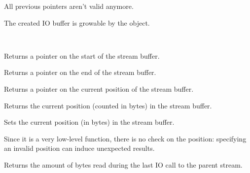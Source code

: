 
All previous pointers aren't valid anymore.


The created IO buffer is growable by the object.


\\

\label{wxstreambuffergetbufferstart}


Returns a pointer on the start of the stream buffer.

\label{wxstreambuffergetbufferend}


Returns a pointer on the end of the stream buffer.

\label{wxstreambuffergetbufferpos}


Returns a pointer on the current position of the stream buffer.

\label{wxstreambuffergetintposition}


Returns the current position (counted in bytes) in the stream buffer.

\label{wxstreambuffersetintposition}


Sets the current position (in bytes) in the stream buffer.


Since it is a very low-level function, there is no check on the position:
specifying an invalid position can induce unexpected results.

\label{wxstreambuffergetlastaccess}


Returns the amount of bytes read during the last IO call to the parent stream.

